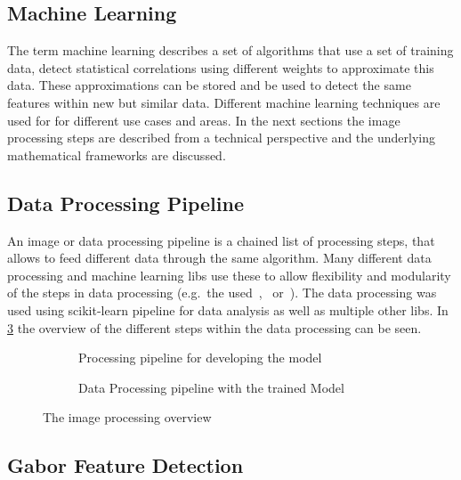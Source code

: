 \documentclass[12pt,a4paper, english]{article}
\begin{document}
    \subsection{Machine Learning}\label{sec:ml}
    The term machine learning describes a set of algorithms that use a set of training data, detect statistical correlations using different weights to approximate this data. %
    These approximations can be stored and be used to detect the same features within new but similar data.
    Different machine learning techniques are used for for different use cases and areas.
%
  In the next sections the image processing steps are described from a technical perspective and the underlying mathematical frameworks are discussed.
%
    \subsection{Data Processing Pipeline}
    An image or data processing pipeline is a chained list of processing steps, that allows to feed different data through the same algorithm. 
    Many different data processing and machine learning \glspl{lib} use these to allow flexibility and modularity of the steps in data processing (e.g.\ the used~\cite{scikit-learn},~\cite{keras} or~\cite{gluon}). 
    The data processing was used using scikit-learn pipeline for data analysis as well as multiple other \glspl{lib}. 
    In \cref{fig:pipeline} the overview of the different steps within the data processing can be seen.
%
    \begin{figure}[!htbp]
       \begin{subfigure}[b]{0.50\textwidth}
         
         \caption{Processing pipeline for developing the model}\label{fig:pipelineTraining}
       \end{subfigure}
       \begin{subfigure}[b]{0.50\textwidth}
         
         \caption{Data Processing pipeline with the trained Model}\label{fig:pipelineTrained}
       \end{subfigure}
       \caption{The image processing overview\label{fig:pipeline}}
     \end{figure}
%
\newpage
\subsection{Gabor Feature Detection}\label{sec:gabor}
\end{document}
